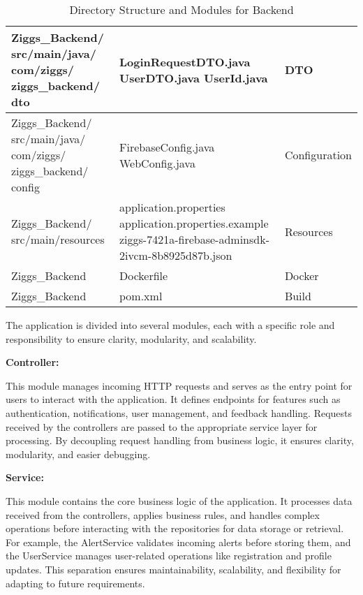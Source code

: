 \documentclass[conference]{IEEEtran}
\begin{document}
\begin{table}[H]
\begin{tabular}{|m{2.6cm}|m{3.5cm}|m{1.6cm}|}
Ziggs\_Backend/ src/main/java/ com/ziggs/ ziggs\_backend/ dto & 
LoginRequestDTO.java \newline 
UserDTO.java \newline 
UserId.java
& 
DTO \\ \hline

Ziggs\_Backend/ src/main/java/ com/ziggs/ ziggs\_backend/ config & 
FirebaseConfig.java \newline 
WebConfig.java & 
Configuration \\ \hline

Ziggs\_Backend/ src/main/resources & 
application.properties \newline 
application.properties.example \newline 
ziggs-7421a-firebase-adminsdk-2ivcm-8b8925d87b.json & 
Resources \\ \hline

Ziggs\_Backend & 
Dockerfile & 
Docker \\ \hline

Ziggs\_Backend & 
pom.xml & 
Build \\ \hline

\end{tabular}
\caption{Directory Structure and Modules for Backend}
\end{table}


The application is divided into several modules, each with a specific role and responsibility to ensure clarity, modularity, and scalability.

\vspace{0.5cm}

\textbf{Controller:}  

This module manages incoming HTTP requests and serves as the entry point for users to interact with the application. It defines endpoints for features such as authentication, notifications, user management, and feedback handling. Requests received by the controllers are passed to the appropriate service layer for processing. By decoupling request handling from business logic, it ensures clarity, modularity, and easier debugging.

\vspace{0.5cm}

\textbf{Service:}  

This module contains the core business logic of the application. It processes data received from the controllers, applies business rules, and handles complex operations before interacting with the repositories for data storage or retrieval. For example, the AlertService validates incoming alerts before storing them, and the UserService manages user-related operations like registration and profile updates. This separation ensures maintainability, scalability, and flexibility for adapting to future requirements.
\end{document}
